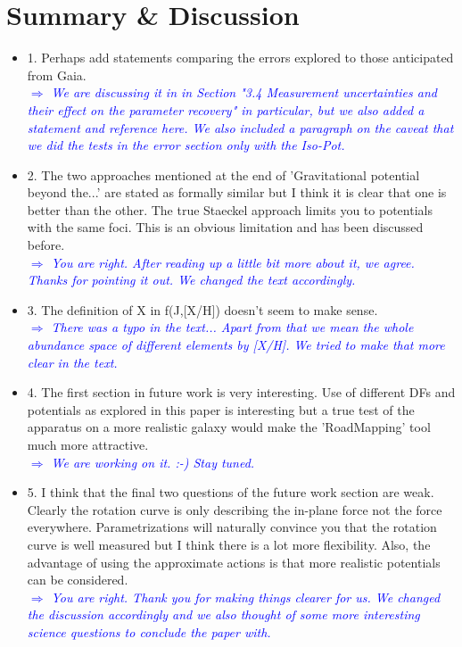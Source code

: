 \documentclass[10pt,a4paper]{article}
\newcommand{\Comment}[1]{\textsl{\textcolor{Blue}{$\Longrightarrow$ {#1}}}}
\begin{document}
\section{Summary \& Discussion}
\begin{itemize}
\item 1. Perhaps add statements comparing the errors explored to those anticipated from Gaia. \\\Comment{We are discussing it in in Section "3.4 Measurement uncertainties and their effect on the parameter recovery" in particular, but we also added a statement and reference here. We also included a paragraph on the caveat that we did the tests in the error section only with the Iso-Pot.}
\item 2. The two approaches mentioned at the end of 'Gravitational potential beyond the...' are stated as formally similar but I think it is clear that one is better than the other. The true Staeckel approach limits you to potentials with the same foci. This is an obvious limitation and has been discussed before. \\\Comment{You are right. After reading up a little bit more about it, we agree. Thanks for pointing it out. We changed the text accordingly.}
\item 3. The definition of X in f(J,[X/H]) doesn't seem to make sense. \\\Comment{There was a typo in the text... Apart from that we mean the whole abundance space of different elements by [X/H]. We tried to make that more clear in the text.}
\item 4. The first section in future work is very interesting. Use of different DFs and potentials as explored in this paper is interesting but a true test of the apparatus on a more realistic galaxy would make the 'RoadMapping' tool much more attractive. \\\Comment{We are working on it. :-) Stay tuned.}
\item 5. I think that the final two questions of the future work section are weak. Clearly the rotation curve is only describing the in-plane force not the force everywhere. Parametrizations will naturally convince you that the rotation curve is well measured but I think there is a lot more flexibility. Also, the advantage of using the approximate actions is that more realistic potentials can be considered. \\\Comment{You are right. Thank you for making things clearer for us. We changed the discussion accordingly and we also thought of some more interesting science questions to conclude the paper with.}

\end{itemize}
\end{document}
